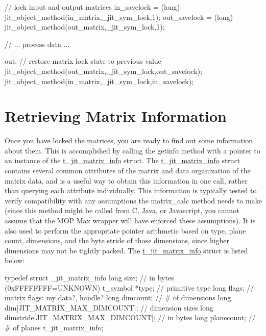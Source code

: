 \begin{DoxyCode}
   // lock input and output matrices   
   in_savelock = (long) jit_object_method(in_matrix,_jit_sym_lock,1);
   out_savelock = (long) jit_object_method(out_matrix,_jit_sym_lock,1);

   // ... process data ...

out:
   // restore matrix lock state to previous value
   jit_object_method(out_matrix,_jit_sym_lock,out_savelock);
   jit_object_method(in_matrix,_jit_sym_lock,in_savelock);
\end{DoxyCode}
\hypertarget{chapter_jit_mopdetails_chapter_jit_mopdetails_info}{}\section{Retrieving Matrix Information}\label{chapter_jit_mopdetails_chapter_jit_mopdetails_info}
Once you have locked the matrices, you are ready to find out some information about them. This is accomplished by calling the getinfo method with a pointer to an instance of the \hyperlink{structt__jit__matrix__info}{t\_\-jit\_\-matrix\_\-info} struct. The \hyperlink{structt__jit__matrix__info}{t\_\-jit\_\-matrix\_\-info} struct contains several common attributes of the matrix and data organization of the matrix data, and is a useful way to obtain this information in one call, rather than querying each attribute individually. This information is typically tested to verify compatibility with any assumptions the matrix\_\-calc method needs to make (since this method might be called from C, Java, or Javascript, you cannot assume that the MOP Max wrapper will have enforced these assumptions). It is also used to perform the appropriate pointer arithmetic based on type, plane count, dimensions, and the byte stride of those dimensions, since higher dimensions may not be tightly packed. The \hyperlink{structt__jit__matrix__info}{t\_\-jit\_\-matrix\_\-info} struct is listed below:


\begin{DoxyCode}
typedef struct _jit_matrix_info
{
   long      size;         // in bytes (0xFFFFFFFF=UNKNOWN)
   t_symbol   *type;         // primitive type
   long      flags;         // matrix flags: my data?, handle?
   long      dimcount;      // # of dimensions
   long      dim[JIT_MATRIX_MAX_DIMCOUNT]; // dimension sizes      
   long      dimstride[JIT_MATRIX_MAX_DIMCOUNT]; // in bytes
   long      planecount;      // # of planes
} t_jit_matrix_info;
\end{DoxyCode}


